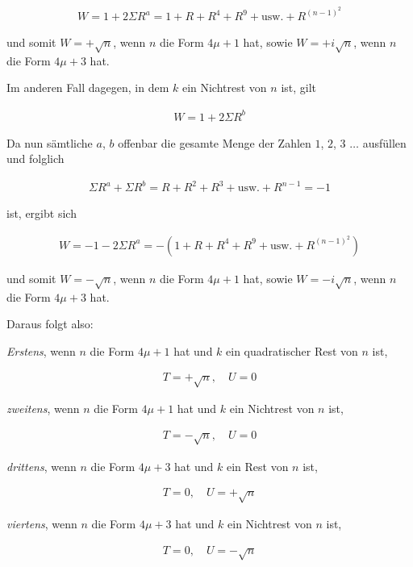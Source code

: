 \[
\begin{aligned}
W=1+2\Sigma R^a=1+R+R^4+R^9+\text{usw.}+R^{(n-1)^2}
\end{aligned}
\]

und somit $W=+\surd n$, wenn $n$ die Form $4\mu+1$ hat, sowie $W=+i\surd n$, wenn $n$ die Form $4\mu+3$ hat.

Im anderen Fall dagegen, in dem $k$ ein Nichtrest von $n$ ist, gilt

\[
\begin{aligned}
W=1+2\Sigma R^b
\end{aligned}
\]

Da nun sämtliche $a$, $b$ offenbar die gesamte Menge der Zahlen $1$, $2$, $3$ $\ldots$ ausfüllen und folglich

\[
\begin{aligned}
\Sigma R^a+\Sigma R^b=R+R^2+R^3+\text{usw.}+R^{n-1}=-1
\end{aligned}
\]

ist, ergibt sich

\[
\begin{aligned}
W=-1-2\Sigma R^a=-(1+R+R^4+R^9+\text{usw.}+R^{(n-1)^2})
\end{aligned}
\]

und somit $W=-\surd n$, wenn $n$ die Form $4\mu+1$ hat, sowie $W=-i\surd n$, wenn $n$ die Form $4\mu+3$ hat.

Daraus folgt also:

\emph{Erstens}, wenn $n$ die Form $4\mu+1$ hat und $k$ ein quadratischer Rest von $n$ ist,

\[
\begin{aligned}
T=+\surd n,\quad U=0
\end{aligned}
\]

\emph{zweitens}, wenn $n$ die Form $4\mu+1$ hat und $k$ ein Nichtrest von $n$ ist,

\[
\begin{aligned}
T=-\surd n,\quad U=0
\end{aligned}
\]

\emph{drittens}, wenn $n$ die Form $4\mu+3$ hat und $k$ ein Rest von $n$ ist,

\[
\begin{aligned}
T=0,\quad U=+\surd n
\end{aligned}
\]

\emph{viertens}, wenn $n$ die Form $4\mu+3$ hat und $k$ ein Nichtrest von $n$ ist,

\[
\begin{aligned}
T=0,\quad U=-\surd n
\end{aligned}
\]
